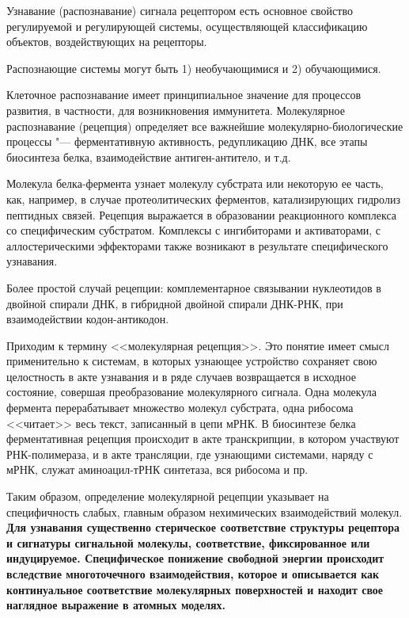 \documentclass[12pt,a4paper,oneside]{book}
\begin{document}
Узнавание (распознавание) сигнала рецептором есть основное свойство регулируемой и регулирующей системы, осуществляющей классификацию объектов, воздействующих на рецепторы.

Распознающие системы могут быть 1) необучающимися и 2) обучающимися.

Клеточное распознавание имеет принципиальное значение для процессов развития, в частности, для возникновения иммунитета. Молекулярное распознавание (рецепция) определяет все важнейшие молекулярно-биологические процессы "--- ферментативную активность, редупликацию ДНК, все этапы биосинтеза белка, взаимодействие антиген-антитело, и т.д.

Молекула белка-фермента узнает молекулу субстрата или некоторую ее часть, как, например, в случае протеолитических ферментов, катализирующих гидролиз пептидных связей. Рецепция выражается в образовании реакционного комплекса со специфическим субстратом. Комплексы с ингибиторами и активаторами, с аллостерическими эффекторами также возникают в результате специфического узнавания.


Более простой случай рецепции: комплементарное связывании нуклеотидов в двойной спирали ДНК, в гибридной двойной спирали ДНК-РНК, при взаимодействии кодон-антикодон.

Приходим к термину <<молекулярная рецепция>>. Это понятие имеет смысл применительно к системам, в которых узнающее устройство сохраняет свою целостность в акте узнавания и в ряде случаев возвращается в исходное состояние, совершая преобразование молекулярного сигнала. Одна молекула фермента перерабатывает множество молекул субстрата, одна рибосома <<читает>> весь текст, записанный в цепи мРНК. В биосинтезе белка ферментативная рецепция происходит в акте транскрипции, в котором участвуют РНК-полимераза, и в акте трансляции, где узнающими системами, наряду с мРНК, служат аминоацил-тРНК синтетаза, вся рибосома и пр.

Таким образом, определение молекулярной рецепции указывает на специфичность слабых, главным образом нехимических взаимодействий молекул. {\bf Для узнавания существенно стерическое соответствие структуры рецептора и сигнатуры сигнальной молекулы, соответствие, фиксированное или индуцируемое. Специфическое понижение свободной энергии происходит вследствие многоточечного взаимодействия, которое и описывается как континуальное соответствие молекулярных поверхностей и находит свое наглядное выражение в атомных моделях.}
\end{document}
